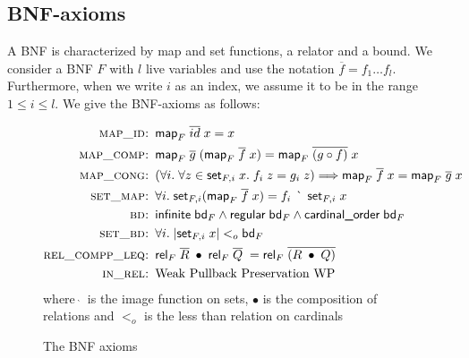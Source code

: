     \subsection{BNF-axioms}
      A \ac{BNF} is characterized by map and set functions, a relator and a bound. We consider a \ac{BNF} $F$ with $l$ live variables and use the notation $\overline{f} = f_1 \dots f_l$. Furthermore, when we write $i$ as an index, we assume it to be in the range $1 \leq i \leq l$.
      We give the \ac{BNF}-axioms as follows:
      \begin{figure}
        \centering
        \begin{align}
          \textsc{map\_id: }& \textsf{map}_F\; \overline{id}\; x = x\\
          \textsc{map\_comp: }& \textsf{map}_F\; \overline{g}\; (\textsf{map}_F\; \overline{f}\; x) = \textsf{map}_F\; \overline{(g \circ f)}\; x\\
          \textsc{map\_cong: }& (\forall i.\; \forall z \in \textsf{set}_{F,i}\; x.\; f_i\; z = g_i\; z) \Longrightarrow 
            \textsf{map}_F\; \overline{f}\; x = \textsf{map}_F\; \overline{g}\; x\\
          \textsc{set\_map: }& \forall i.\; \textsf{set}_{F,i} (\textsf{map}_F\; \overline{f}\; x) = f_i\; \grave{\phantom{\_}}\; \textsf{set}_{F,i}\; x\\
          \textsc{bd: }& \textsf{infinite}\; \textsf{bd}_F \land 
            \textsf{regular}\; \textsf{bd}_F \land 
            \textsf{cardinal\_order}\; \textsf{bd}_F\\
          \textsc{set\_bd: }& \forall i.\; | \textsf{set}_{F,i}\; x | <_o \textsf{bd}_F\\
          \textsc{rel\_compp\_leq: }& \textsf{rel}_F\; \overline{R}\; \bullet\; \textsf{rel}_F\; \overline{Q}\; = 
            \textsf{rel}_F\; \overline{(R\; \bullet\; Q)}\\
          \textsc{in\_rel: }& \text{Weak Pullback Preservation WP}
        \end{align}
        \newline
        \footnotesize
        where $\grave{\phantom{\_}}$ is the image function on sets, $\bullet$ is the composition of relations and $<_o$ is the less than relation on cardinals
        \caption{The \ac{BNF} axioms}
        \label{fig:bnf_axioms}
      \end{figure}

